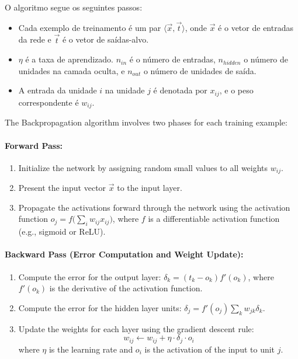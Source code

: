 \documentclass{tufte-handout}
\begin{document}
O algoritmo segue os seguintes passos:

\begin{itemize}
\item Cada exemplo de treinamento é um par $\langle \Vec{x}, \Vec{t} \rangle$, onde $\Vec{x}$ é o vetor de entradas da rede e $\Vec{t}$ é o vetor de saídas-alvo.
\item $\eta$ é a taxa de aprendizado. $n_{in}$ é o número de entradas, $n_{hidden}$ o número de unidades na camada oculta, e $n_{out}$ o número de unidades de saída.
\item A entrada da unidade $i$ na unidade $j$ é denotada por $x_{ij}$, e o peso correspondente é $w_{ij}$.
\end{itemize}

The Backpropagation algorithm involves two phases for each training example:

\paragraph{Forward Pass:} 
\begin{enumerate}
    \item Initialize the network by assigning random small values to all weights $w_{ij}$.
    \item Present the input vector $\Vec{x}$ to the input layer.
    \item Propagate the activations forward through the network using the activation function $o_j = f\big( \sum_i w_{ij} x_{ij} \big)$, where $f$ is a differentiable activation function (e.g., sigmoid or ReLU).
\end{enumerate}

\paragraph{Backward Pass (Error Computation and Weight Update):}
\begin{enumerate}
    \item Compute the error for the output layer: $\delta_k = (t_k - o_k)f'(o_k)$, where $f'(o_k)$ is the derivative of the activation function.
    \item Compute the error for the hidden layer units: $\delta_j = f'(o_j) \sum_k w_{jk} \delta_k$.
    \item Update the weights for each layer using the gradient descent rule:
    \begin{equation}
        w_{ij} \leftarrow w_{ij} + \eta \cdot \delta_j \cdot o_i
    \end{equation}
    where $\eta$ is the learning rate and $o_i$ is the activation of the input to unit $j$.
\end{enumerate}
\end{document}
